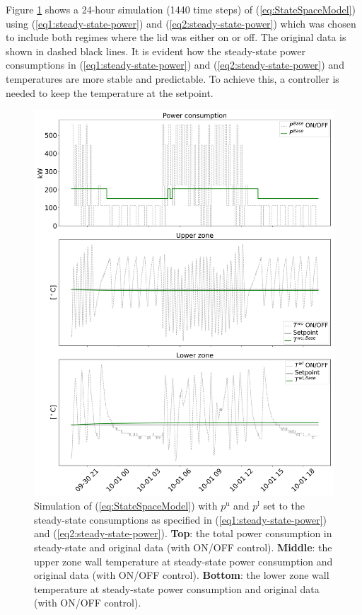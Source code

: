 \documentclass[conference]{IEEEtran}
\begin{document}
{Figure \ref{fig:4thOrderModelVisualizationSteadyState} shows a 24-hour simulation (1440 time steps) of (\ref{eq:StateSpaceModel}) using (\ref{eq1:steady-state-power}) and (\ref{eq2:steady-state-power}) which was chosen to include both regimes where the lid was either on or off. The original data is shown in dashed black lines. It is evident how the steady-state power consumptions in (\ref{eq1:steady-state-power}) and (\ref{eq2:steady-state-power}) and temperatures are  more stable and predictable. To achieve this, a controller is needed to keep the temperature at the setpoint.

\begin{figure}[t]
    \centering
    \includegraphics[width=\columnwidth]{../figures/4thOrderModelVisualizationSteadyState.png}
    \caption{Simulation of (\ref{eq:StateSpaceModel}) with $p^{\text{u}}$ and $p^{\text{l}}$ set to the steady-state consumptions as specified in (\ref{eq1:steady-state-power}) and (\ref{eq2:steady-state-power}). \textbf{Top}: the total power consumption in steady-state and original data (with ON/OFF control). \textbf{Middle}: the upper zone wall temperature at steady-state power consumption and original data (with ON/OFF control). \textbf{Bottom}: the lower zone wall temperature at steady-state power consumption and original data (with ON/OFF control).}
    \label{fig:4thOrderModelVisualizationSteadyState}
\end{figure}

}
\end{document}
